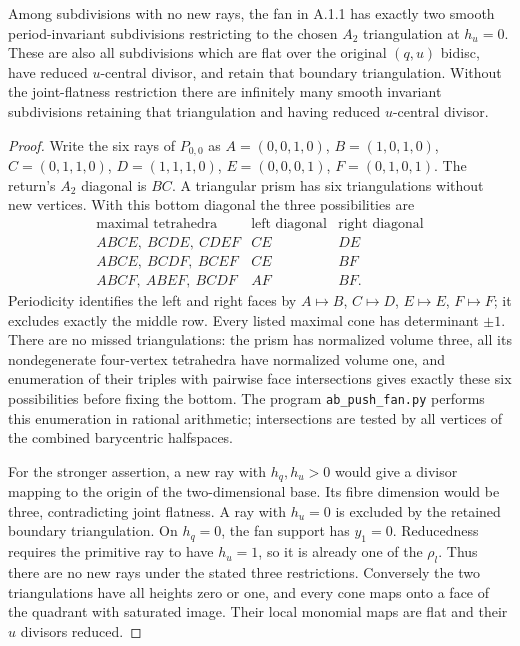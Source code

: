 \begin{proposition}[A.2.1; Proved]\label{push:A21}
Among subdivisions with no new rays, the fan in A.1.1 has exactly
two smooth period-invariant subdivisions restricting to the chosen
$A_2$ triangulation at $h_u=0$. These are also all subdivisions
which are flat over the original $(q,u)$ bidisc, have reduced
$u$-central divisor, and retain that boundary triangulation.
Without the joint-flatness restriction there are infinitely many
smooth invariant subdivisions retaining that triangulation and
having reduced $u$-central divisor.
\end{proposition}
\begin{proof}
Write the six rays of $P_{0,0}$ as
$A=(0,0,1,0)$, $B=(1,0,1,0)$, $C=(0,1,1,0)$,
$D=(1,1,1,0)$, $E=(0,0,0,1)$, $F=(0,1,0,1)$.
The return's $A_2$ diagonal is $BC$. A triangular prism has six
triangulations without new vertices. With this bottom diagonal
the three possibilities are
\[
\begin{array}{c|c|c}
\text{maximal tetrahedra}&\text{left diagonal}&\text{right diagonal}\\\hline
ABCE,\ BCDE,\ CDEF&CE&DE\\
ABCE,\ BCDF,\ BCEF&CE&BF\\
ABCF,\ ABEF,\ BCDF&AF&BF.
\end{array}
\]
Periodicity identifies the left and right faces by $A\mapsto B$,
$C\mapsto D$, $E\mapsto E$, $F\mapsto F$; it excludes exactly
the middle row. Every listed maximal cone has determinant $\pm1$.
There are no missed triangulations: the prism has normalized volume
three, all its nondegenerate four-vertex tetrahedra have normalized
volume one, and enumeration of their triples with pairwise
face intersections gives exactly these six possibilities before
fixing the bottom. The program \texttt{ab\_push\_fan.py} performs
this enumeration in rational arithmetic; intersections are tested
by all vertices of the combined barycentric halfspaces.

For the stronger assertion, a new ray with $h_q,h_u>0$ would
give a divisor mapping to the origin of the two-dimensional base.
Its fibre dimension would be three, contradicting joint flatness.
A ray with $h_u=0$ is excluded by the retained boundary
triangulation. On $h_q=0$, the fan support has $y_1=0$.
Reducedness requires the primitive ray to have $h_u=1$, so it
is already one of the $\rho_l$. Thus there are no new rays under
the stated three restrictions. Conversely the two triangulations
have all heights zero or one, and every cone maps onto a face of
the quadrant with saturated image. Their local monomial maps
are flat and their $u$ divisors reduced.


\end{proof}
